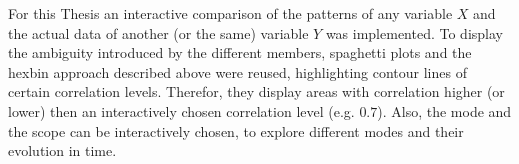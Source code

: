 For this Thesis an interactive comparison of the patterns of any variable $X$ and the actual data of another (or the same) variable $Y$ was implemented.
To display the ambiguity introduced by the different members, spaghetti plots and the hexbin approach described above were reused, highlighting contour lines of certain correlation levels. 
Therefor, they display areas with correlation higher (or lower) then an interactively chosen correlation level (e.g. $0.7$). 
Also, the mode and the scope can be interactively chosen, to explore different modes and their evolution in time. 


%
%
%


